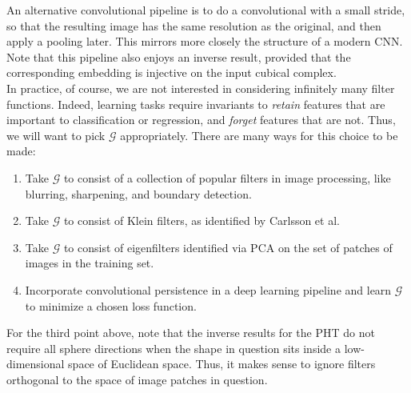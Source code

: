 \documentclass[12pt]{amsart}
\numberwithin{figure}{section}
\begin{document}
An alternative convolutional pipeline is to do a convolutional with a small stride, so that the resulting image has the same resolution as the original, and then apply a pooling later. This mirrors more closely the structure of a modern CNN. Note that this pipeline also enjoys an inverse result, provided that the corresponding embedding is injective on the input cubical complex.\\

In practice, of course, we are not interested in considering infinitely many filter functions. Indeed, learning tasks require invariants to \emph{retain} features that are important to classification or regression, and \emph{forget} features that are not. Thus, we will want to pick $\mathcal{G}$ appropriately. There are many ways for this choice to be made:
\begin{enumerate}
	\item Take $\mathcal{G}$ to consist of a collection of popular filters in image processing, like blurring, sharpening, and boundary detection.
	\item Take $\mathcal{G}$ to consist of Klein filters, as identified by Carlsson et al.
	\item Take $\mathcal{G}$ to consist of eigenfilters identified via PCA on the set of patches of images in the training set.
	\item Incorporate convolutional persistence in a deep learning pipeline and learn $\mathcal{G}$ to minimize a chosen loss function.
\end{enumerate}

For the third point above, note that the inverse results for the PHT do not require all sphere directions when the shape in question sits inside a low-dimensional space of Euclidean space. Thus, it makes sense to ignore filters orthogonal to the space of image patches in question.\\

 
\end{document}
